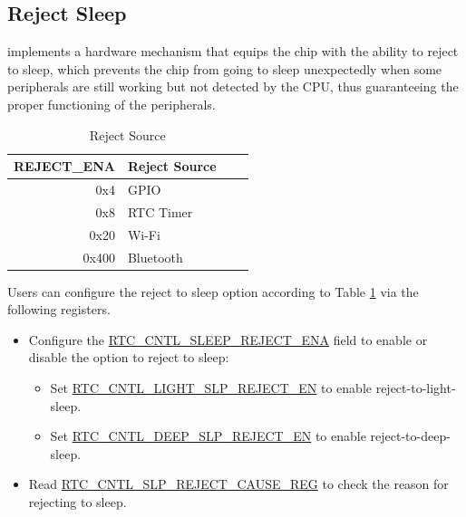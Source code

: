 \documentclass[main\_\_EN.tex]{subfiles}
\begin{document}
\subsection{Reject Sleep}\label{sec:lpm-reject-source}

\chipname{} implements a hardware mechanism that equips the chip with the ability to reject to sleep, which prevents the chip from going to sleep unexpectedly when some peripherals are still working but not detected by the CPU, thus guaranteeing the proper functioning of the peripherals.


\begin{table}[H]
    \centering
    \caption{Reject Source}
    \label{tab:lpm-reject-source}
    \begin{threeparttable}
    \begin{tabular}{| r | l | c | c |}
    \hline
    \rowcolor{lightgray}
    \textbf{REJECT\_ENA} & \textbf{Reject Source}  \\\hline
    0x4 & GPIO \\\hline
    0x8 & RTC Timer \\\hline
    0x20 & Wi-Fi\\\hline
    0x400 & Bluetooth\\\hline
    \end{tabular}
    \end{threeparttable}
\end{table}

Users can configure the reject to sleep option according to Table \ref{tab:lpm-reject-source} via the following registers.
\begin{itemize}
    \item Configure the \hyperref[fielddesc:RTCCNTLSLEEPREJECTENA]{RTC\_CNTL\_SLEEP\_REJECT\_ENA} field to enable or disable the option to reject to sleep:
        \begin{itemize}
            \item Set \hyperref[fielddesc:RTCCNTLLIGHTSLPREJECTEN]{RTC\_CNTL\_LIGHT\_SLP\_REJECT\_EN} to enable reject-to-light-sleep.
            \item Set \hyperref[fielddesc:RTCCNTLDEEPSLPREJECTEN]{RTC\_CNTL\_DEEP\_SLP\_REJECT\_EN} to enable reject-to-deep-sleep.
        \end{itemize}
    \item Read \hyperref[fielddesc:RTCCNTLREJECTCAUSE]{RTC\_CNTL\_SLP\_REJECT\_CAUSE\_REG} to check the reason for rejecting to sleep.


\end{itemize}
\end{document}
